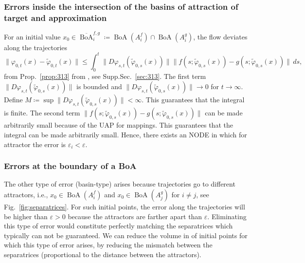 \documentclass{article}
\theoremstyle{definition} \newtheorem{definition}{Definition}
\theoremstyle{remark} \newtheorem{remark}{Remark}
\newcommand{\boa}{\operatorname{BoA}}
\newcounter{ct}
\begin{document}
\subsubsection{Errors inside the intersection of the basins of attraction of target and approximation}\label{sec:inboa_approx}
For an initial value $x_0\in \overline{\boa}_i^{f,g} \coloneqq \boa(A_i^f) \cap \boa(A_i^g)$, the flow deviates along the trajectories 
\[
\|\varphi_{0,t}(x) - \tilde{\varphi}_{0,t}(x)\| \leq \int_0^t \|D\varphi_{s,t}(\tilde{\varphi}_{0,s}(x))\| \|f(s; \tilde{\varphi}_{0,s}(x)) - g(s; \tilde{\varphi}_{0,s}(x))\| \, ds,
\]
from Prop.~\ref{prop:313} from \citep{vanhandel2007filtering}, see Supp.Sec.~\ref{sec:313}.
%
%
The first term \(\|D\varphi_{s,t}(\tilde{\varphi}_{0,s}(x))\|\) is bounded %
and \(\|D\varphi_{s,t}(\tilde{\varphi}_{0,s}(x))\|\rightarrow 0\) for \(t\rightarrow\infty\).
Define $M\coloneqq \sup \|D\varphi_{s,t}(\tilde{\varphi}_{0,s}(x))\|<\infty$. 
%
This guarantees that the integral is finite.
%
The second term $\|f(s; \tilde{\varphi}_{0,s}(x)) - g(s; \tilde{\varphi}_{0,s}(x))\|$
can be made arbitrarily small because of the UAP for mappings.
%
This guarantees that the integral can be made arbitrarily small.	
Hence, there exists an NODE in which for attractor the error is $\varepsilon_i<\varepsilon$. 






\subsubsection{Errors at the boundary of a BoA}\label{sec:boa_errors}%
\label{sec:separatrix_approx}
The other type of error (basin-type) arises because trajectories go to different attractors, i.e., $x_0\in \boa(A_i^f)$ and $x_0\in \boa(A_j^g)$ for $i\neq j$, see Fig.~\ref{fig:separatrices}.
For such initial points, the error along the trajectories will be higher than $\varepsilon>0$ because the attractors are farther apart than $\varepsilon$.
Eliminating this type of error would constitute perfectly matching the separatrices which typically can not be guaranteed.
We can reduce the volume in of initial points for which this type of error arises, by reducing the mismatch between the separatrices (proportional to the distance between the attractors).
\end{document}
